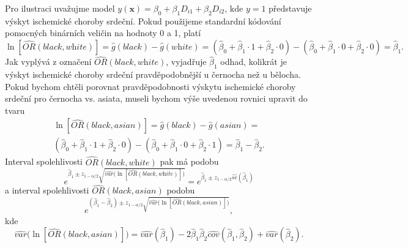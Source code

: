 Pro ilustraci uvažujme model $y(\pmb{x}) = \beta_0 + \beta_1 D_{i1} + \beta_2 D_{i2}$, kde $y = 1$ představuje výskyt ischemické choroby srdeční. Pokud použijeme standardní kódování pomocných binárních veličin na hodnoty 0 a 1, platí
\begin{equation}
\ln[\widehat{OR}(\textit{black}, \textit{white})] = \hat{g}(\textit{black}) - \hat{g}(\textit{white}) = (\hat{\beta}_0 + \hat{\beta}_1 \cdot 1 + \hat{\beta}_2 \cdot 0) - (\hat{\beta}_0 + \hat{\beta}_1 \cdot 0 + \hat{\beta}_2 \cdot 0) = \hat{\beta}_1.
\end{equation}
Jak vyplývá z označení $\widehat{OR}(\textit{black}, \textit{white})$, vyjadřuje $\hat{\beta}_1$ odhad, kolikrát je výskyt ischemické choroby srdeční pravděpodobnější u černocha než u bělocha.  Pokud bychom chtěli porovnat pravděpodobnosti výskytu ischemické choroby srdeční pro černocha vs. asiata, museli bychom výše uvedenou rovnici upravit do tvaru
\begin{multline}
\ln[\widehat{OR}(\textit{black}, \textit{asian})] = \hat{g}(\textit{black}) - \hat{g}(\textit{asian}) =\\(\hat{\beta}_0 + \hat{\beta}_1 \cdot 1 + \hat{\beta}_2 \cdot 0) - (\hat{\beta}_0 + \hat{\beta}_1 \cdot 0 + \hat{\beta}_2 \cdot 1) = \hat{\beta}_1 - \hat{\beta}_2.
\end{multline}
Interval spolehlivosti $\widehat{OR}(\textit{black}, \textit{white})$ pak má podobu
\begin{equation}
e^{\hat{\beta}_1 \pm z_{1 - \alpha / 2} \sqrt{\widehat{var}\big(\ln[\widehat{OR}(\textit{black}, \textit{white})]\big)}} = e^{\hat{\beta}_1 \pm z_{1 - \alpha / 2} \widehat{se}(\hat{\beta}_1)}
\end{equation}
a interval spolehlivosti $\widehat{OR}(\textit{black}, \textit{asian})$ podobu
\begin{equation}
e^{(\hat{\beta}_1 - \hat{\beta}_2) \pm z_{1 - \alpha / 2} \sqrt{\widehat{var}\big(\ln[\widehat{OR}(\textit{black}, \textit{asian})]\big)}},
\end{equation}
kde
\begin{equation}
\widehat{var}\big(\ln[\widehat{OR}(\textit{black}, \textit{asian})]\big) = \widehat{var}(\hat{\beta}_1) - 2 \hat{\beta}_1 \hat{\beta}_2 \widehat{cov}(\hat{\beta}_1, \hat{\beta}_2) + \widehat{var}(\hat{\beta}_2).
\end{equation}

